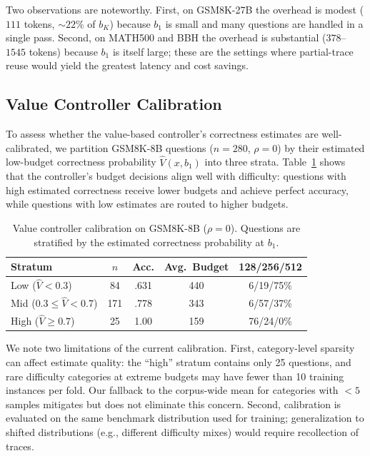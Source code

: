 Two observations are noteworthy.
First, on GSM8K-27B the overhead is modest ($111$ tokens, $\sim\!22\%$ of $b_K$) because $b_1$ is small and many questions are handled in a single pass.
Second, on MATH500 and BBH the overhead is substantial ($378$--$1545$ tokens) because $b_1$ is itself large; these are the settings where partial-trace reuse would yield the greatest latency and cost savings.

\subsection{Value Controller Calibration}
\label{app:value-calibration}

To assess whether the value-based controller's correctness estimates are well-calibrated, we partition GSM8K-8B questions ($n=280$, $\rho=0$) by their estimated low-budget correctness probability $\hat{V}(x, b_1)$ into three strata.
Table~\ref{tab:calibration} shows that the controller's budget decisions align well with difficulty: questions with high estimated correctness receive lower budgets and achieve perfect accuracy, while questions with low estimates are routed to higher budgets.

\begin{table}[ht]
\centering
\caption{Value controller calibration on GSM8K-8B ($\rho=0$). Questions are stratified by the estimated correctness probability at $b_1$.}
\label{tab:calibration}
\small
\begin{tabular}{@{}lcccc@{}}
\toprule
\textbf{Stratum} & $n$ & \textbf{Acc.} & \textbf{Avg.\ Budget} & \textbf{128/256/512} \\
\midrule
Low ($\hat{V}{<}0.3$) & 84 & .631 & 440 & 6/19/75\% \\
Mid ($0.3{\leq}\hat{V}{<}0.7$) & 171 & .778 & 343 & 6/57/37\% \\
High ($\hat{V}{\geq}0.7$) & 25 & 1.00 & 159 & 76/24/0\% \\
\bottomrule
\end{tabular}
\end{table}

We note two limitations of the current calibration.
First, category-level sparsity can affect estimate quality: the ``high'' stratum contains only 25 questions, and rare difficulty categories at extreme budgets may have fewer than 10 training instances per fold.
Our fallback to the corpus-wide mean for categories with $<5$ samples mitigates but does not eliminate this concern.
Second, calibration is evaluated on the same benchmark distribution used for training; generalization to shifted distributions (e.g., different difficulty mixes) would require recollection of traces.


